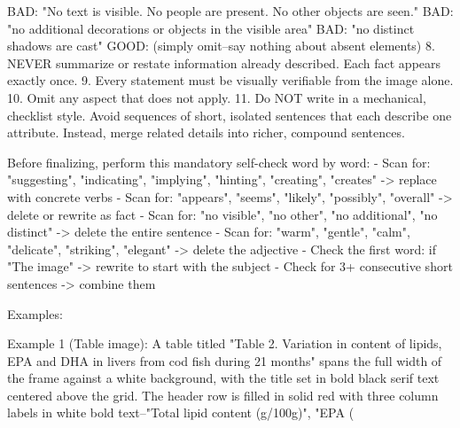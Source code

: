 \begin{tcblisting}
   BAD: "No text is visible. No people are present. No other objects are seen."
   BAD: "no additional decorations or objects in the visible area"
   BAD: "no distinct shadows are cast"
   GOOD: (simply omit--say nothing about absent elements)
8. NEVER summarize or restate information already described. Each fact appears exactly once.
9. Every statement must be visually verifiable from the image alone.
10. Omit any aspect that does not apply.
11. Do NOT write in a mechanical, checklist style. Avoid sequences of short, isolated sentences that each describe one attribute. Instead, merge related details into richer, compound sentences.

Before finalizing, perform this mandatory self-check word by word:
- Scan for: "suggesting", "indicating", "implying", "hinting", "creating", "creates" -> replace with concrete verbs
- Scan for: "appears", "seems", "likely", "possibly", "overall" -> delete or rewrite as fact
- Scan for: "no visible", "no other", "no additional", "no distinct" -> delete the entire sentence
- Scan for: "warm", "gentle", "calm", "delicate", "striking", "elegant" -> delete the adjective
- Check the first word: if "The image" -> rewrite to start with the subject
- Check for 3+ consecutive short sentences -> combine them

Examples:

Example 1 (Table image):
A table titled "Table 2. Variation in content of lipids, EPA and DHA in livers from cod fish during 21 months" spans the full width of the frame against a white background, with the title set in bold black serif text centered above the grid. The header row is filled in solid red with three column labels in white bold text--"Total lipid content (g/100g)", "EPA (%


\end{tcblisting}
